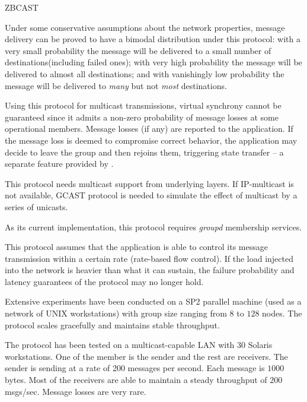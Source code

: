 \begin{Layer}{ZBCAST}
\begin{Properties}
\item
Under some conservative assumptions about the network properties,
message delivery can be proved to have a bimodal distribution under
this protocol: with a very small probability the message will be
delivered to a small number of destinations(including failed ones);
with very high probability the message will be delivered to almost all
destinations; and with vanishingly low probability the message will be
delivered to \emph{many} but not \emph{most} destinations.

\item
Using this protocol for multicast transmissions, virtual synchrony
cannot be guaranteed since it admits a non-zero probability of message
losses at some operational members.  Message losses (if any) are
reported to the application.  If the message loss is deemed to
compromise correct behavior, the application may decide to leave the
group and then rejoins them, triggering state transfer -- a separate
feature provided by \ensemble.

\item
This protocol needs multicast support from underlying layers.  If
IP-multicast is not available, GCAST protocol is needed to simulate
the effect of multicast by a series of unicasts.

\item
As its current implementation, this protocol requires \emph{groupd}
membership services.

\item
This protocol assumes that the application is able to control its
message transmission within a certain rate (rate-based flow control).
If the load injected into the network is heavier than what it can
sustain, the failure probability and latency guarantees of the
protocol may no longer hold.
\end{Properties}

\begin{Sources}
\end{Sources}

\begin{GenEvent}
\end{GenEvent}

\begin{Testing}
\item
Extensive experiments have been conducted on a SP2 parallel machine
(used as a network of UNIX workstations) with group size ranging from
$8$ to $128$ nodes.  The protocol scales gracefully and maintains
stable throughput.
\item
The protocol has been tested on a multicast-capable LAN with 30
Solaris workstations.  One of the member is the sender and the rest
are receivers.  The sender is sending at a rate of 200 messages per
second.  Each message is $1000$ bytes.  Most of the receivers are able
to maintain a steady throughput of $200$ msgs/sec.  Message losses are
very rare.


\end{Testing}
\end{Layer}
